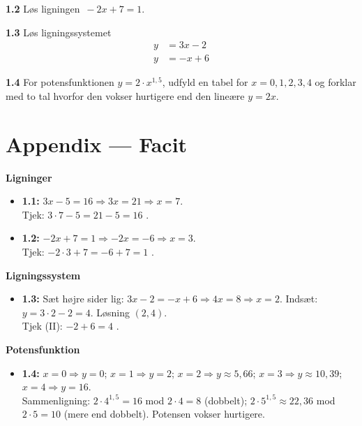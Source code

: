 \documentclass[11pt,a4paper]{article}
\begin{document}
\begin{prompt}
\textbf{1.2} \quad Løs ligningen $\,-2x + 7 = 1$.
\end{prompt}

\begin{prompt}
\textbf{1.3} \quad Løs ligningssystemet
\begin{align*}
  y &= 3x - 2 \\
  y &= -x + 6
\end{align*}
\end{prompt}

\begin{prompt}
\textbf{1.4} \quad For potensfunktionen $y = 2 \cdot x^{1{,}5}$, udfyld en
tabel for $x=0,1,2,3,4$ og forklar med to tal hvorfor den vokser hurtigere
end den lineære $y = 2x$.
\end{prompt}

\newpage
\section*{Appendix --- Facit}

\noindent\textbf{Ligninger}
\begin{itemize}[leftmargin=2em, itemsep=4pt]
  \item \textbf{1.1:} $3x-5=16 \Rightarrow 3x=21 \Rightarrow x=7$.\\
        Tjek: $3\cdot 7 - 5 = 21-5 = 16$ \checkmark.
  \item \textbf{1.2:} $-2x+7=1 \Rightarrow -2x=-6 \Rightarrow x=3$.\\
        Tjek: $-2\cdot 3 + 7 = -6+7 = 1$ \checkmark.
\end{itemize}

\noindent\textbf{Ligningssystem}
\begin{itemize}[leftmargin=2em, itemsep=4pt]
  \item \textbf{1.3:} Sæt højre sider lig: $3x-2 = -x+6 \Rightarrow 4x=8
        \Rightarrow x=2$. Indsæt: $y = 3\cdot 2 - 2 = 4$. Løsning $(2,4)$.\\
        Tjek (II): $-2+6 = 4$ \checkmark.
\end{itemize}

\noindent\textbf{Potensfunktion}
\begin{itemize}[leftmargin=2em, itemsep=4pt]
  \item \textbf{1.4:} $x=0 \Rightarrow y=0$; $x=1 \Rightarrow y=2$;
        $x=2 \Rightarrow y \approx 5{,}66$; $x=3 \Rightarrow y \approx 10{,}39$;
        $x=4 \Rightarrow y = 16$.\\
        Sammenligning: $2\cdot 4^{1{,}5} = 16$ mod $2\cdot 4 = 8$ (dobbelt);
        $2\cdot 5^{1{,}5} \approx 22{,}36$ mod $2\cdot 5 = 10$ (mere end
        dobbelt). Potensen vokser hurtigere.
\end{itemize}
\end{document}
